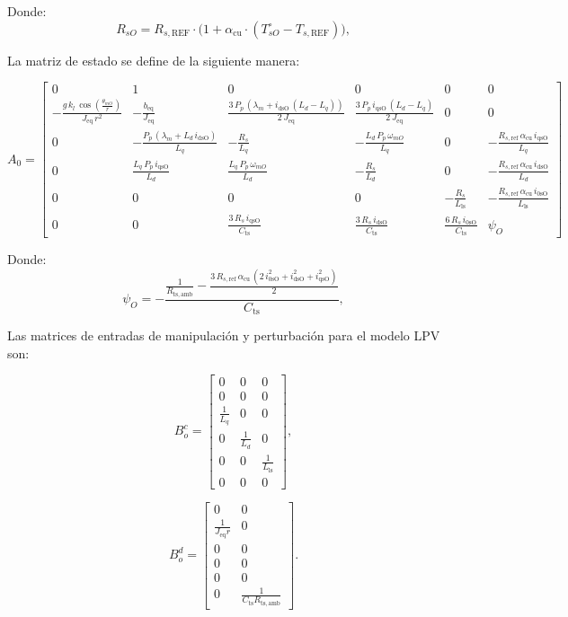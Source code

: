 \documentclass{article}
\begin{document}
Donde:
\[
R_{sO} = R_{s, \text{REF}} \cdot \Big( 1 + \alpha_\text{cu} \cdot (T_{sO}^\circ - T_{s, \text{REF}}) \Big),
\]

La matriz de estado se define de la siguiente manera:

\[
A_0 = 
\begin{bmatrix}
0 & 1 & 0 & 0 & 0 & 0 \\
-\frac{g\,k_l\,\cos\left(\frac{\theta_{mO}}{r}\right)}{J_{\mathrm{eq}}\,r^2} & -\frac{b_{\mathrm{eq}}}{J_{\mathrm{eq}}} & \frac{3\,P_p\,\left(\lambda_m + i_{\mathrm{dsO}}\,(L_d - L_q)\right)}{2\,J_{\mathrm{eq}}} & \frac{3\,P_p\,i_{\mathrm{qsO}}\,(L_d - L_q)}{2\,J_{\mathrm{eq}}} & 0 & 0 \\
0 & -\frac{P_p\,\left(\lambda_m + L_d\,i_{\mathrm{dsO}}\right)}{L_q} & -\frac{R_s}{L_q} & -\frac{L_d\,P_p\,\omega_{mO}}{L_q} & 0 & -\frac{R_{s,\mathrm{ref}}\,\alpha_{\mathrm{cu}}\,i_{\mathrm{qsO}}}{L_q} \\
0 & \frac{L_q\,P_p\,i_{\mathrm{qsO}}}{L_d} & \frac{L_q\,P_p\,\omega_{mO}}{L_d} & -\frac{R_s}{L_d} & 0 & -\frac{R_{s,\mathrm{ref}}\,\alpha_{\mathrm{cu}}\,i_{\mathrm{dsO}}}{L_d} \\
0 & 0 & 0 & 0 & -\frac{R_s}{L_{\mathrm{ls}}} & -\frac{R_{s,\mathrm{ref}}\,\alpha_{\mathrm{cu}}\,i_{\mathrm{0sO}}}{L_{\mathrm{ls}}} \\
0 & 0 & \frac{3\,R_s\,i_{\mathrm{qsO}}}{C_{\mathrm{ts}}} & \frac{3\,R_s\,i_{\mathrm{dsO}}}{C_{\mathrm{ts}}} & \frac{6\,R_s\,i_{\mathrm{0sO}}}{C_{\mathrm{ts}}} & \psi_O
\end{bmatrix}
\]

 Donde: 
\[
\psi_O = -\frac{\frac{1}{R_{\mathrm{ts},\mathrm{amb}}} - \frac{3\,R_{s,\mathrm{ref}}\,\alpha_{\mathrm{cu}}\,\left(2\,i_{\mathrm{0sO}}^2 + i_{\mathrm{dsO}}^2 + i_{\mathrm{qsO}}^2\right)}{2}}{C_{\mathrm{ts}}},
\]

Las matrices de entradas de manipulación y perturbación para el modelo LPV son:

\[
B_o^c = 
\begin{bmatrix}
0 & 0 & 0 \\
0 & 0 & 0 \\
\frac{1}{L_q} & 0 & 0 \\
0 & \frac{1}{L_d} & 0 \\
0 & 0 & \frac{1}{L_{\mathrm{ls}}} \\
0 & 0 & 0
\end{bmatrix},
\]

\[
B_o^d = 
\begin{bmatrix}
0 & 0 \\
\frac{1}{J_{\mathrm{eq}} r} & 0 \\
0 & 0 \\
0 & 0 \\
0 & 0 \\
0 & \frac{1}{C_{\mathrm{ts}} R_{\mathrm{ts},\mathrm{amb}}}
\end{bmatrix}.
\]
\newpage
\end{document}
